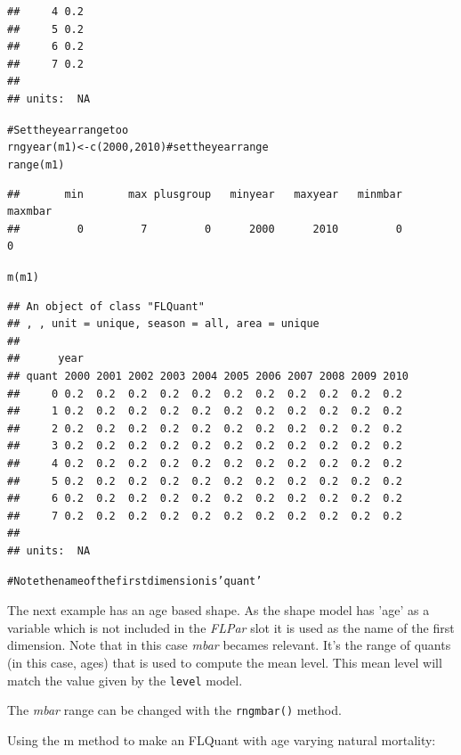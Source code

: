 \documentclass[a4paper,english,10pt]{article}\usepackage[]{graphicx}\usepackage[]{color}
\makeatletter
\newcommand{\hlnum}[1]{\textcolor[rgb]{0.2,0.2,0.2}{#1}}%
\newcommand{\hlcom}[1]{\textcolor[rgb]{0.2,0.267,0.4}{#1}}%
\newcommand{\hlstd}[1]{\textcolor[rgb]{0,0,0}{#1}}%
\newcommand{\hlkwb}[1]{\textcolor[rgb]{0.361,0.506,0.596}{#1}}%
\newcommand{\hlkwd}[1]{\textcolor[rgb]{0.361,0.506,0.596}{#1}}%
\newenvironment{kframe}{%
 \def\at@end@of@kframe{}%
 \ifinner\ifhmode%
  \def\at@end@of@kframe{\end{minipage}}%
  \begin{minipage}{\columnwidth}%
 \fi\fi%
 \def\FrameCommand##1{\hskip\@totalleftmargin \hskip-\fboxsep
 \colorbox{shadecolor}{##1}\hskip-\fboxsep
     \hskip-\linewidth \hskip-\@totalleftmargin \hskip\columnwidth}%
 \MakeFramed {\advance\hsize-\width
   \@totalleftmargin\z@ \linewidth\hsize
   \@setminipage}}%
 {\par\unskip\endMakeFramed%
 \at@end@of@kframe}
\newenvironment{knitrout}{}{} %
\newcommand{\code}[1]{{\texttt{#1}}}
\newcommand{\class}[1]{{\textit{#1}}}
\makeatother
\begin{document}
\begin{knitrout}
\begin{kframe}
\begin{verbatim}
##     4 0.2
##     5 0.2
##     6 0.2
##     7 0.2
## 
## units:  NA
\end{verbatim}
\begin{alltt}
\hlcom{# Set the year range too}
\hlkwd{rngyear}\hlstd{(m1)} \hlkwb{<-} \hlkwd{c}\hlstd{(}\hlnum{2000}\hlstd{,} \hlnum{2010}\hlstd{)}  \hlcom{# set the year range}
\hlkwd{range}\hlstd{(m1)}
\end{alltt}
\begin{verbatim}
##       min       max plusgroup   minyear   maxyear   minmbar   maxmbar 
##         0         7         0      2000      2010         0         0
\end{verbatim}
\begin{alltt}
\hlkwd{m}\hlstd{(m1)}
\end{alltt}
\begin{verbatim}
## An object of class "FLQuant"
## , , unit = unique, season = all, area = unique
## 
##      year
## quant 2000 2001 2002 2003 2004 2005 2006 2007 2008 2009 2010
##     0 0.2  0.2  0.2  0.2  0.2  0.2  0.2  0.2  0.2  0.2  0.2 
##     1 0.2  0.2  0.2  0.2  0.2  0.2  0.2  0.2  0.2  0.2  0.2 
##     2 0.2  0.2  0.2  0.2  0.2  0.2  0.2  0.2  0.2  0.2  0.2 
##     3 0.2  0.2  0.2  0.2  0.2  0.2  0.2  0.2  0.2  0.2  0.2 
##     4 0.2  0.2  0.2  0.2  0.2  0.2  0.2  0.2  0.2  0.2  0.2 
##     5 0.2  0.2  0.2  0.2  0.2  0.2  0.2  0.2  0.2  0.2  0.2 
##     6 0.2  0.2  0.2  0.2  0.2  0.2  0.2  0.2  0.2  0.2  0.2 
##     7 0.2  0.2  0.2  0.2  0.2  0.2  0.2  0.2  0.2  0.2  0.2 
## 
## units:  NA
\end{verbatim}
\begin{alltt}
\hlcom{# Note the name of the first dimension is 'quant'}
\end{alltt}
\end{kframe}
\end{knitrout}


The next example has an age based shape. As the shape model has 'age' as a variable which is not included in the \class{FLPar} slot it is used as the name of the first dimension. Note that in this case \emph{mbar} becames relevant. It's the range of quants (in this case, ages) that is used to compute the mean level. This mean level will match the value given by the \code{level} model.

The \emph{mbar} range can be changed with the \code{rngmbar()} method.

Using the m method to make an FLQuant with age varying natural mortality:
\end{document}
